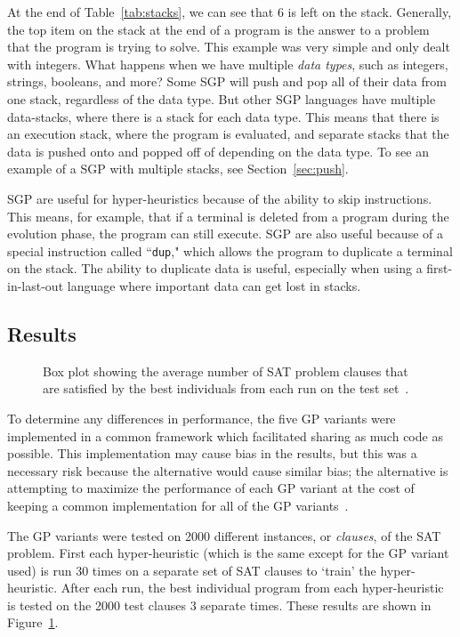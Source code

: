 \documentclass{sig-alternate}
\begin{document}
At the end of Table~\ref{tab:stacks}, we can see that 6 is left on the stack. Generally, the top item on the stack at the end of a program is the answer to a problem that the program is trying to solve. This example was very simple and only dealt with integers. What happens when we have multiple \textit{data types}, such as integers, strings, booleans, and more? Some SGP will push and pop all of their data from one stack, regardless of the data type. But other SGP languages have multiple data-stacks, where there is a stack for each data type. This means that there is an execution stack, where the program is evaluated, and separate stacks that the data is pushed onto and popped off of depending on the data type. To see an example of a SGP with multiple stacks, see Section~\ref{sec:push}.

SGP are useful for hyper-heuristics because of the ability to skip instructions. This means, for example, that if a terminal is deleted from a program during the evolution phase, the program can still execute. SGP are also useful because of a special instruction called ``\texttt{dup}," which allows the program to duplicate a terminal on the stack. The ability to duplicate data is useful, especially when using a first-in-last-out language where important data can get lost in stacks.

\subsection{Results}
\label{sec:gpresults}
\begin{figure}
	\centering
	\caption{Box plot showing the average number of SAT problem clauses that are satisfied by the best individuals from each run on the test set~\cite{harris:2015}.}
	\label{fig:gpvariants}
\end{figure}

To determine any differences in performance, the five GP variants were implemented in a common framework which facilitated sharing as much code as possible. This implementation may cause bias in the results, but this was a necessary risk because the alternative would cause similar bias; the alternative is attempting to maximize the performance of each GP variant at the cost of keeping a common implementation for all of the GP variants~\cite{harris:2015}.

The GP variants were tested on 2000 different instances, or \textit{clauses}, of the SAT problem. First each hyper-heuristic (which is the same except for the GP variant used) is run 30 times on a separate set of SAT clauses to `train' the hyper-heuristic. After each run, the best individual program from each hyper-heuristic is tested on the 2000 test clauses 3 separate times. These results are shown in Figure~\ref{fig:gpvariants}.
\end{document}
